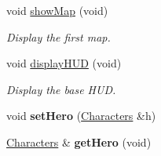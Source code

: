\begin{DoxyCompactItemize}
void \hyperlink{class_game_ab1ab415f40c6a952da0f93a7bf3ffee1}{show\-Map} (void)
\begin{DoxyCompactList}\small\item\em Display the first map. \end{DoxyCompactList}\item 
void \hyperlink{class_game_a194dbc017575c98bda4e2317d266a67e}{display\-H\-U\-D} (void)
\begin{DoxyCompactList}\small\item\em Display the base H\-U\-D. \end{DoxyCompactList}\item 
\hypertarget{class_game_a730c7eeaa90f5ceab71abce303bfd367}{void {\bfseries set\-Hero} (\hyperlink{class_characters}{Characters} \&h)}\label{class_game_a730c7eeaa90f5ceab71abce303bfd367}

\item 
\hypertarget{class_game_a7f62e55c834c5ee4b626acb58f5bbd28}{\hyperlink{class_characters}{Characters} \& {\bfseries get\-Hero} (void)}\label{class_game_a7f62e55c834c5ee4b626acb58f5bbd28}

\end{DoxyCompactItemize}
